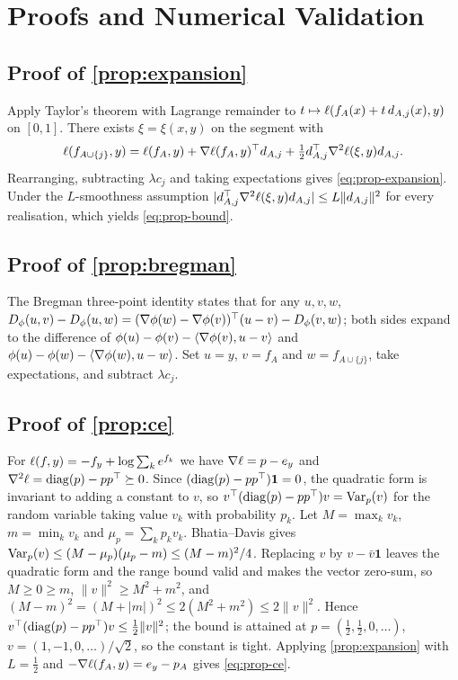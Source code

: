 \appendix
\section{Proofs and Numerical Validation}
\label{app:proofs}

\subsection{Proof of \cref{prop:expansion}}
Apply Taylor's theorem with Lagrange remainder to
$t\mapsto\ell(f_A(x)+t\,d_{A,j}(x),y)$ on $[0,1]$. There exists
$\xi=\xi(x,y)$ on the segment with
\begin{equation}
 \ell(f_{A\cup\{j\}},y)
 =
 \ell(f_A,y)+\nabla\ell(f_A,y)^\top d_{A,j}
 +\tfrac12 d_{A,j}^\top\nabla^2\ell(\xi,y)d_{A,j} .
\end{equation}
Rearranging, subtracting $\lambda c_j$ and taking expectations gives
\eqref{eq:prop-expansion}. Under the $L$-smoothness assumption
$|d_{A,j}^\top\nabla^2\ell(\xi,y)d_{A,j}|\leq L\|d_{A,j}\|^2$ for every realisation,
which yields \eqref{eq:prop-bound}.

\subsection{Proof of \cref{prop:bregman}}
The Bregman three-point identity states that for any $u,v,w$,
$D_\phi(u,v)-D_\phi(u,w)=(\nabla\phi(w)-\nabla\phi(v))^\top(u-v)-D_\phi(v,w)$;
both sides expand to the difference of
$\phi(u)-\phi(v)-\langle\nabla\phi(v),u-v\rangle$ and
$\phi(u)-\phi(w)-\langle\nabla\phi(w),u-w\rangle$. Set $u=y$, $v=f_A$ and
$w=f_{A\cup\{j\}}$, take expectations, and subtract $\lambda c_j$.

\subsection{Proof of \cref{prop:ce}}
For $\ell(f,y)=-f_y+\log\sum_k e^{f_k}$ we have $\nabla\ell=p-e_y$ and
$\nabla^2\ell=\mathrm{diag}(p)-pp^\top\succeq0$. Since
$(\mathrm{diag}(p)-pp^\top)\mathbf 1=0$, the quadratic form is invariant to adding a
constant to $v$, so $v^\top(\mathrm{diag}(p)-pp^\top)v=\operatorname{Var}_p(v)$ for the random
variable taking value $v_k$ with probability $p_k$. Let $M=\max_k v_k$,
$m=\min_k v_k$ and $\mu_p=\sum_k p_k v_k$. Bhatia--Davis gives
$\operatorname{Var}_p(v)\leq(M-\mu_p)(\mu_p-m)\leq(M-m)^2/4$. Replacing $v$ by
$v-\bar v\mathbf 1$ leaves the quadratic form and the range bound valid and
makes the vector zero-sum, so $M\geq0\geq m$, $\|v\|^2\geq M^2+m^2$, and
$(M-m)^2=(M+|m|)^2\leq2(M^2+m^2)\leq2\|v\|^2$. Hence
$v^\top(\mathrm{diag}(p)-pp^\top)v\leq\tfrac12\|v\|^2$; the bound is attained at
$p=(\tfrac12,\tfrac12,0,\dots)$, $v=(1,-1,0,\dots)/\sqrt2$, so the constant is
tight. Applying \cref{prop:expansion} with $L=\tfrac12$ and
$-\nabla\ell(f_A,y)=e_y-p_A$ gives \eqref{eq:prop-ce}.

